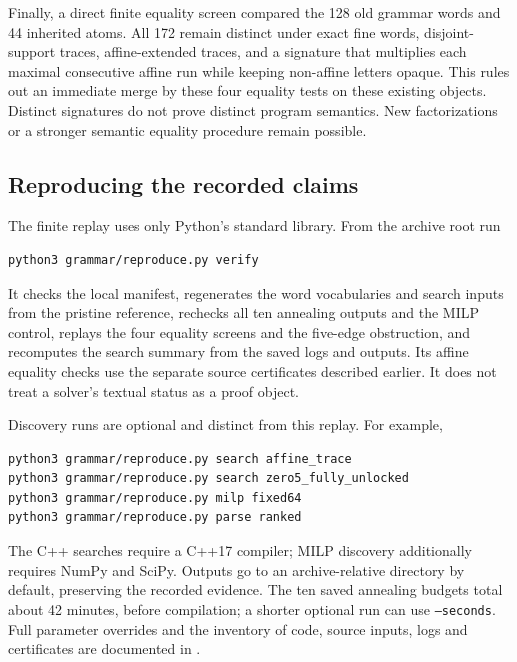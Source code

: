Finally, a direct finite equality screen compared the 128 old grammar
words and 44 inherited atoms.  All 172 remain distinct under exact fine
words, disjoint-support traces, affine-extended traces, and a signature
that multiplies each maximal consecutive affine run while keeping
non-affine letters opaque.  This rules out an immediate merge by these
four equality tests on these existing objects.  Distinct signatures do
not prove distinct program semantics.  New factorizations or a stronger
semantic equality procedure remain possible.



\subsection{Reproducing the recorded claims}

The finite replay uses only Python's standard library.  From the archive
root run
\begin{verbatim}
python3 grammar/reproduce.py verify
\end{verbatim}
It checks the local manifest, regenerates the word vocabularies and
search inputs from the pristine reference, rechecks all ten annealing
outputs and the MILP control, replays the four equality screens and the
five-edge obstruction, and recomputes the search summary from the saved
logs and outputs.  Its affine equality checks use the separate source
certificates described earlier.  It does not treat a solver's textual
status as a proof object.

Discovery runs are optional and distinct from this replay.  For example,
\begin{verbatim}
python3 grammar/reproduce.py search affine_trace
python3 grammar/reproduce.py search zero5_fully_unlocked
python3 grammar/reproduce.py milp fixed64
python3 grammar/reproduce.py parse ranked
\end{verbatim}
The C++ searches require a C++17 compiler; MILP discovery additionally
requires NumPy and SciPy.  Outputs go to an archive-relative
 directory by default, preserving the recorded
evidence.  The ten saved annealing budgets total about 42 minutes, before
compilation; a shorter optional run can use \texttt{--seconds}.  Full
parameter overrides and the inventory of code, source inputs, logs and
certificates are documented in .
